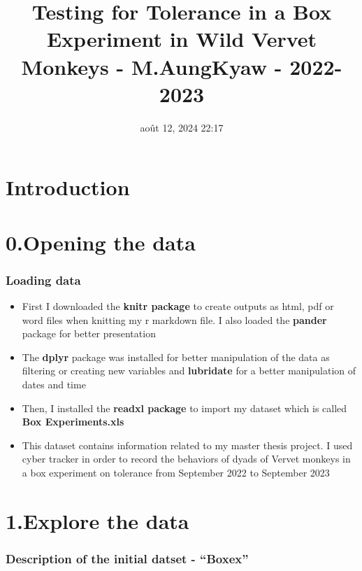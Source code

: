 \documentclass[
]{article}
\title{Testing for Tolerance in a Box Experiment in Wild Vervet Monkeys
- M.AungKyaw - 2022-2023}
\author{}
\date{\vspace{-2.5em}août 12, 2024 22:17}
\providecommand{\tightlist}{%
  \setlength{\itemsep}{0pt}\setlength{\parskip}{0pt}}
\begin{document}
\maketitle

{
\setcounter{tocdepth}{6}
\tableofcontents
}
\hypertarget{introduction}{%
\section{Introduction}\label{introduction}}

\hypertarget{opening-the-data}{%
\section{0.Opening the data}\label{opening-the-data}}

\hypertarget{loading-data}{%
\subsubsection{Loading data}\label{loading-data}}

\begin{itemize}
\tightlist
\item
  First I downloaded the \textbf{knitr package} to create outputs as
  html, pdf or word files when knitting my r markdown file. I also
  loaded the \textbf{pander} package for better presentation
\item
  The \textbf{dplyr} package was installed for better manipulation of
  the data as filtering or creating new variables and \textbf{lubridate}
  for a better manipulation of dates and time
\item
  Then, I installed the \textbf{readxl package} to import my dataset
  which is called \textbf{Box Experiments.xls}
\item
  This dataset contains information related to my master thesis project.
  I used cyber tracker in order to record the behaviors of dyads of
  Vervet monkeys in a box experiment on tolerance from September 2022 to
  September 2023
\end{itemize}

\hypertarget{explore-the-data}{%
\section{1.Explore the data}\label{explore-the-data}}

\hypertarget{description-of-the-initial-datset---boxex}{%
\subsubsection{Description of the initial datset -
``Boxex''}\label{description-of-the-initial-datset---boxex}}
\end{document}
